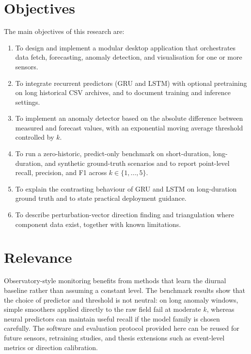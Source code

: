 \section{Objectives}
The main objectives of this research are:
\begin{enumerate}[label=(\alph*)]
    \item To design and implement a modular desktop application that orchestrates data fetch, forecasting, anomaly detection, and visualisation for one or more sensors.
    \item To integrate recurrent predictors (GRU and LSTM) with optional pretraining on long historical CSV archives, and to document training and inference settings.
    \item To implement an anomaly detector based on the absolute difference between measured and forecast values, with an exponential moving average threshold controlled by $k$.
    \item To run a zero-historic, predict-only benchmark on short-duration, long-duration, and synthetic ground-truth scenarios and to report point-level recall, precision, and F1 across $k \in \{1,\ldots,5\}$.
    \item To explain the contrasting behaviour of GRU and LSTM on long-duration ground truth and to state practical deployment guidance.
    \item To describe perturbation-vector direction finding and triangulation where component data exist, together with known limitations.
\end{enumerate}

\section{Relevance}
Observatory-style monitoring benefits from methods that learn the diurnal baseline rather than assuming a constant level. The benchmark results show that the choice of predictor and threshold is not neutral: on long anomaly windows, simple smoothers applied directly to the raw field fail at moderate $k$, whereas neural predictors can maintain useful recall if the model family is chosen carefully. The software and evaluation protocol provided here can be reused for future sensors, retraining studies, and thesis extensions such as event-level metrics or direction calibration.

